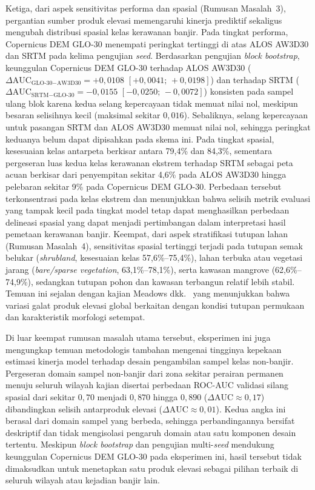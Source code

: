 \documentclass[12pt,a4paper]{article}
\begin{document}
Ketiga, dari aspek sensitivitas performa dan spasial (Rumusan Masalah~3),
pergantian sumber produk elevasi memengaruhi kinerja prediktif
sekaligus mengubah distribusi spasial kelas kerawanan banjir. Pada tingkat
performa, Copernicus DEM GLO-30 menempati peringkat tertinggi di atas ALOS
AW3D30 dan SRTM pada kelima pengujian \textit{seed}. Berdasarkan pengujian
\textit{block bootstrap}, keunggulan Copernicus DEM GLO-30 terhadap ALOS
AW3D30 ($\Delta\text{AUC}_{\text{GLO-30}-\text{AW3D30}} = +0{,}0108$
$[+0{,}0041;\,+0{,}0198]$) dan terhadap SRTM
($\Delta\text{AUC}_{\text{SRTM}-\text{GLO-30}} = -0{,}0155$
$[-0{,}0250;\,-0{,}0072]$) konsisten pada sampel ulang blok karena kedua
selang kepercayaan tidak memuat nilai nol, meskipun besaran selisihnya kecil
(maksimal sekitar $0{,}016$). Sebaliknya, selang kepercayaan untuk pasangan
SRTM dan ALOS AW3D30 memuat nilai nol, sehingga peringkat keduanya belum
dapat dipisahkan pada skema ini. Pada tingkat spasial, kesesuaian kelas
antarpeta berkisar antara 79,4\% dan 84,3\%, sementara pergeseran luas kedua
kelas kerawanan ekstrem terhadap SRTM sebagai peta acuan berkisar dari
penyempitan sekitar 4,6\% pada ALOS AW3D30 hingga pelebaran sekitar 9\%
pada Copernicus DEM GLO-30. Perbedaan tersebut terkonsentrasi pada kelas ekstrem dan
menunjukkan bahwa selisih metrik evaluasi yang tampak kecil pada tingkat
model tetap dapat menghasilkan perbedaan delineasi spasial yang dapat
menjadi pertimbangan dalam interpretasi hasil pemetaan kerawanan banjir.
Keempat, dari aspek stratifikasi tutupan lahan
(Rumusan Masalah~4), sensitivitas spasial tertinggi terjadi pada tutupan
semak belukar (\textit{shrubland}, kesesuaian kelas 57,6\%--75,4\%), lahan
terbuka atau vegetasi jarang (\textit{bare/sparse vegetation},
63,1\%--78,1\%), serta kawasan mangrove (62,6\%--74,9\%), sedangkan tutupan
pohon dan kawasan terbangun relatif lebih stabil. Temuan ini sejalan dengan
kajian Meadows dkk.\ \citep{meadows2024} yang menunjukkan bahwa variasi
galat produk elevasi global berkaitan dengan kondisi tutupan permukaan dan
karakteristik morfologi setempat.

\enlargethispage{\baselineskip}Di luar keempat rumusan masalah utama tersebut, eksperimen ini juga mengungkap
temuan metodologis tambahan mengenai tingginya kepekaan estimasi kinerja model
terhadap desain pengambilan sampel kelas non-banjir. Pergeseran
domain sampel non-banjir dari zona sekitar perairan permanen menuju seluruh
wilayah kajian disertai perbedaan ROC-AUC validasi silang spasial dari sekitar
$0{,}70$ menjadi $0{,}870$ hingga $0{,}890$ ($\Delta\text{AUC} \approx
0{,}17$) dibandingkan selisih antarproduk elevasi
($\Delta\text{AUC} \approx 0{,}01$). Kedua angka ini berasal dari domain
sampel yang berbeda, sehingga perbandingannya bersifat deskriptif dan tidak
mengisolasi pengaruh domain atau satu komponen desain tertentu. Meskipun
\textit{block bootstrap} dan pengujian multi-\textit{seed} mendukung keunggulan
Copernicus DEM GLO-30 pada eksperimen ini, hasil tersebut tidak dimaksudkan
untuk menetapkan satu produk elevasi sebagai pilihan terbaik di seluruh
wilayah atau kejadian banjir lain.
\end{document}
